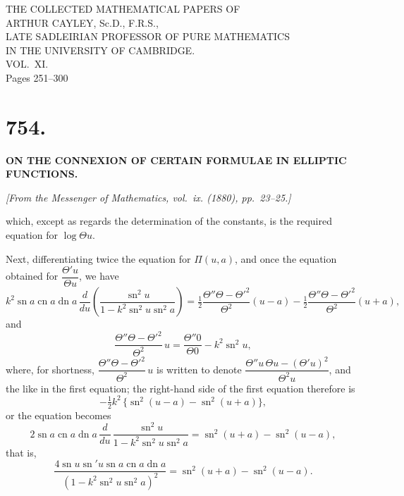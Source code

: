 \documentclass[12pt,a4paper]{article}
\DeclareMathOperator{\sn}{sn}
\DeclareMathOperator{\cn}{cn}
\DeclareMathOperator{\dn}{dn}
\begin{document}
\begin{center}
{\Large THE COLLECTED MATHEMATICAL PAPERS OF}\\[6pt]
{\LARGE ARTHUR CAYLEY, Sc.D., F.R.S.,}\\[3pt]
{\large LATE SADLEIRIAN PROFESSOR OF PURE MATHEMATICS}\\
{\large IN THE UNIVERSITY OF CAMBRIDGE.}\\[12pt]
{\Large VOL.~XI.}\\[24pt]
{\large Pages 251--300}
\end{center}

\newpage


\section*{754.}

\begin{center}
\textbf{ON THE CONNEXION OF CERTAIN FORMULAE IN ELLIPTIC FUNCTIONS.}
\end{center}

\begin{flushright}
\textit{[From the Messenger of Mathematics, vol.~ix. (1880), pp.~23--25.]}
\end{flushright}

\noindent
which, except as regards the determination of the constants, is the required equation
for $\log \Theta u$.

Next, differentiating twice the equation for $\Pi(u, a)$, and once the equation obtained
for $\dfrac{\Theta' u}{\Theta u}$, we have
%
\[
k^2 \sn a \cn a \dn a \, \frac{d}{du}
\left( \frac{\sn^2 u}{1 - k^2 \sn^2 u \sn^2 a} \right)
= \tfrac{1}{2} \frac{\Theta'' \Theta - \Theta'^2}{\Theta^2} (u - a)
- \tfrac{1}{2} \frac{\Theta'' \Theta - \Theta'^2}{\Theta^2} (u + a),
\]
%
and
%
\[
\frac{\Theta'' \Theta - \Theta'^2}{\Theta^2} \, u
= \frac{\Theta'' 0}{\Theta 0} - k^2 \sn^2 u,
\]
%
where, for shortness,
$\dfrac{\Theta'' \Theta - \Theta'^2}{\Theta^2} \, u$
is written to denote
$\dfrac{\Theta'' u \, \Theta u - (\Theta' u)^2}{\Theta^2 u}$,
and the like in the first equation; the right-hand side of the first equation therefore is
%
\[
- \tfrac{1}{2} k^2 \, \{ \sn^2 (u - a) - \sn^2 (u + a) \},
\]
%
or the equation becomes
%
\[
2 \sn a \cn a \dn a \, \frac{d}{du} \,
\frac{\sn^2 u}{1 - k^2 \sn^2 u \sn^2 a}
= \sn^2 (u + a) - \sn^2 (u - a),
\]
%
that is,
%
\[
\frac{4 \sn u \sn' u \sn a \cn a \dn a}
{(1 - k^2 \sn^2 u \sn^2 a)^2}
= \sn^2 (u + a) - \sn^2 (u - a).
\]
\end{document}
